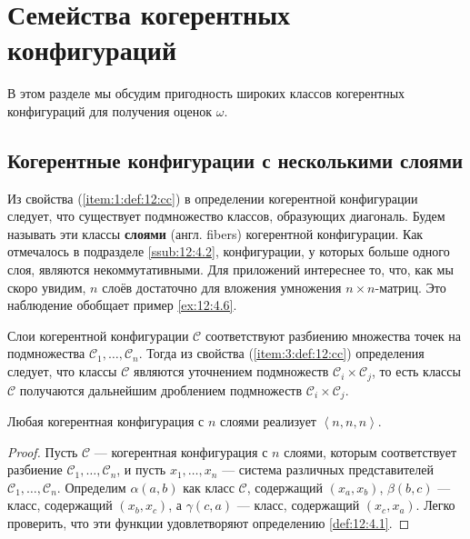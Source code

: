 \section{Семейства когерентных конфигураций}

В этом разделе мы обсудим пригодность широких классов когерентных конфигураций для получения оценок $\omega$.

\subsection{Когерентные конфигурации с несколькими слоями}

Из свойства (\ref{item:1:def:12:cc}) в определении когерентной конфигурации следует, что существует подмножество классов, образующих диагональ. Будем называть эти классы \textbf{слоями} (англ. fibers) когерентной конфигурации. Как отмечалось в подразделе \ref{ssub:12:4.2}, конфигурации, у которых больше одного слоя, являются некоммутативными. Для приложений интереснее то, что, как мы скоро увидим, $n$ слоёв достаточно для вложения умножения $n \times n$-матриц. Это наблюдение обобщает пример \ref{ex:12:4.6}.

Слои когерентной конфигурации $\mathscr{C}$ соответствуют разбиению множества точек на подмножества $\mathscr{C}_1, \dotsc, \mathscr{C}_n$. Тогда из свойства (\ref{item:3:def:12:cc}) определения следует, что классы $\mathscr{C}$ являются уточнением подмножеств $\mathscr{C}_i \times \mathscr{C}_j$, то есть классы $\mathscr{C}$ получаются дальнейшим дроблением подмножеств $\mathscr{C}_i \times \mathscr{C}_j$.

\begin{prop}\label{prop:12:6.1}
     Любая когерентная конфигурация с $n$ слоями реализует $\left\langle n,n,n \right\rangle$.
\end{prop}
\begin{proof}
  Пусть $\mathscr{C}$ --- когерентная конфигурация с $n$ слоями, которым соответствует разбиение $\mathscr{C}_1, \dotsc, \mathscr{C}_n$, и пусть $x_1, \dotsc, x_n$ --- система различных представителей $\mathscr{C}_1, \dotsc, \mathscr{C}_n$. Определим $\alpha(a,b)$ как класс $\mathscr{C}$, содержащий $(x_a, x_b)$, $\beta(b,c)$ --- класс, содержащий $(x_b,x_c)$, а $\gamma(c,a)$ --- класс, содержащий $(x_c,x_a)$. Легко проверить, что эти функции удовлетворяют определению \ref{def:12:4.1}. 
\end{proof}

